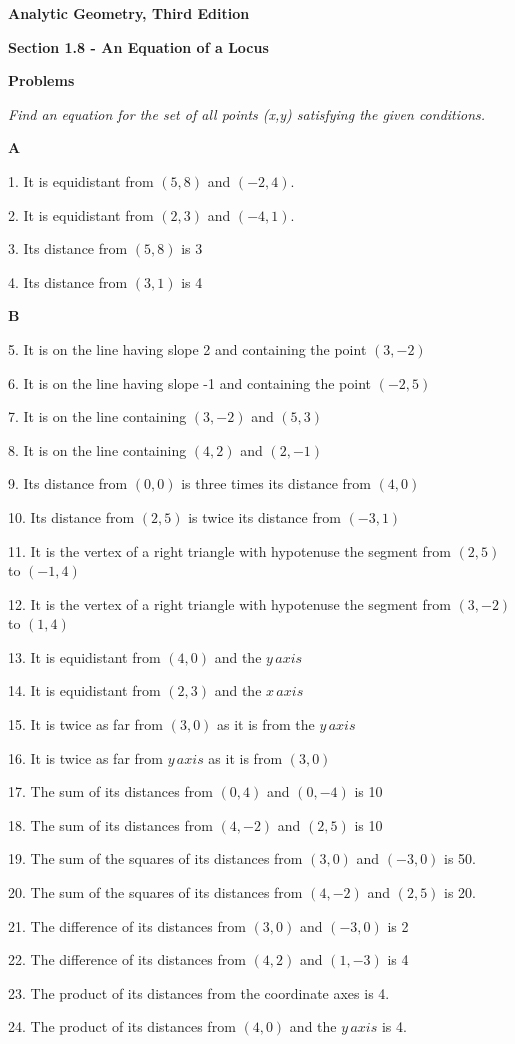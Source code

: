 \documentclass[10pt,letterpaper]{article}
\begin{document}
\textbf{Analytic Geometry, Third Edition}

\textbf{Section 1.8 - An Equation of a Locus}

\medskip
\textbf{Problems}
\medskip

\medskip
\textit{Find an equation for the set of all points (x,y) satisfying the given conditions.}
\medskip

\medskip
\textbf{A}
\medskip

1. It is equidistant from $(5,8)$ and $(-2,4).$

2. It is equidistant from $(2,3)$ and $(-4,1).$

3. Its distance from $(5,8)$ is 3

4. Its distance from $(3,1)$ is 4

\medskip
\textbf{B}
\medskip

5. It is on the line having slope 2 and containing the point $(3,-2)$

6. It is on the line having slope -1 and containing the point $(-2,5)$

7. It is on the line containing $(3,-2)$ and $(5,3)$

8. It is on the line containing $(4,2)$ and $(2,-1)$

9. Its distance from $(0,0)$ is three times its distance from $(4,0)$

10. Its distance from $(2,5)$ is twice its distance from $(-3,1)$

11. It is the vertex of a right triangle with hypotenuse the segment from $(2,5)$ to $(-1,4)$

12. It is the vertex of a right triangle with hypotenuse the segment from $(3,-2)$ to $(1,4)$

13. It is equidistant from $(4,0)$ and the $y\, axis$

14. It is equidistant from $(2,3)$ and the $x\, axis$

15. It is twice as far from $(3,0)$ as it is from the $y\, axis$

16. It is twice as far from $y\, axis$ as it is from $(3,0)$

17. The sum of its distances from $(0,4)$ and $(0,-4)$ is 10

18. The sum of its distances from $(4,-2)$ and $(2,5)$ is 10

19. The sum of the squares of its distances from $(3,0)$ and $(-3,0)$ is 50.

20. The sum of the squares of its distances from $(4,-2)$ and $(2,5)$ is 20.

21. The difference of its distances from $(3,0)$ and $(-3,0)$ is 2

22. The difference of its distances from $(4,2)$ and $(1,-3)$ is 4

23. The product of its distances from the coordinate axes is 4.

24. The product of its distances from $(4,0)$ and the $y\, axis$ is 4.
\end{document}
